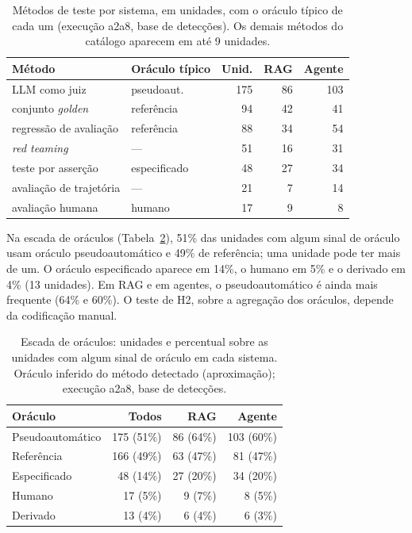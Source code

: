 \documentclass[sigconf]{acmart}
\begin{document}
\begin{table}[t]
  \caption{Métodos de teste por sistema, em unidades, com o oráculo típico de cada um (execução a2a8, base de detecções). Os demais métodos do catálogo aparecem em até 9 unidades.}
  \label{tab:qp2}
  \small
  \begin{tabular}{@{}llrrr@{}}
    \toprule
    Método & Oráculo típico & Unid. & RAG & Agente \\
    \midrule
    LLM como juiz & pseudoaut. & 175 & 86 & 103 \\
    conjunto \textit{golden} & referência & 94 & 42 & 41 \\
    regressão de avaliação & referência & 88 & 34 & 54 \\
    \textit{red teaming} & --- & 51 & 16 & 31 \\
    teste por asserção & especificado & 48 & 27 & 34 \\
    avaliação de trajetória & --- & 21 & 7 & 14 \\
    avaliação humana & humano & 17 & 9 & 8 \\
    \bottomrule
  \end{tabular}
\end{table}

Na escada de oráculos (Tabela~\ref{tab:oraculos}), 51\% das unidades com algum sinal de oráculo usam oráculo pseudoautomático e 49\% de referência; uma unidade pode ter mais de um. O oráculo especificado aparece em 14\%, o humano em 5\% e o derivado em 4\% (13 unidades). Em RAG e em agentes, o pseudoautomático é ainda mais frequente (64\% e 60\%). O teste de H2, sobre a agregação dos oráculos, depende da codificação manual.

\begin{table}[t]
  \caption{Escada de oráculos: unidades e percentual sobre as unidades com algum sinal de oráculo em cada sistema. Oráculo inferido do método detectado (aproximação); execução a2a8, base de detecções.}
  \label{tab:oraculos}
  \small
  \begin{tabular}{lrrr}
    \toprule
    Oráculo & Todos & RAG & Agente \\
    \midrule
    Pseudoautomático & 175 (51\%) & 86 (64\%) & 103 (60\%) \\
    Referência & 166 (49\%) & 63 (47\%) & 81 (47\%) \\
    Especificado & 48 (14\%) & 27 (20\%) & 34 (20\%) \\
    Humano & 17 (5\%) & 9 (7\%) & 8 (5\%) \\
    Derivado & 13 (4\%) & 6 (4\%) & 6 (3\%) \\
    \bottomrule
  \end{tabular}
\end{table}
\end{document}
